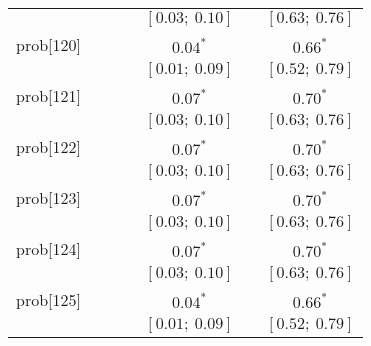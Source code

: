 \begin{table}
\begin{center}
\begin{tabular}{l c c c c c c }
          &                           &                           &                           & $[0.03;\ 0.10]$         &                           & $[0.63;\ 0.76]$       \\
prob[120] &                           &                           &                           & $0.04^{*}$              &                           & $0.66^{*}$            \\
          &                           &                           &                           & $[0.01;\ 0.09]$         &                           & $[0.52;\ 0.79]$       \\
prob[121] &                           &                           &                           & $0.07^{*}$              &                           & $0.70^{*}$            \\
          &                           &                           &                           & $[0.03;\ 0.10]$         &                           & $[0.63;\ 0.76]$       \\
prob[122] &                           &                           &                           & $0.07^{*}$              &                           & $0.70^{*}$            \\
          &                           &                           &                           & $[0.03;\ 0.10]$         &                           & $[0.63;\ 0.76]$       \\
prob[123] &                           &                           &                           & $0.07^{*}$              &                           & $0.70^{*}$            \\
          &                           &                           &                           & $[0.03;\ 0.10]$         &                           & $[0.63;\ 0.76]$       \\
prob[124] &                           &                           &                           & $0.07^{*}$              &                           & $0.70^{*}$            \\
          &                           &                           &                           & $[0.03;\ 0.10]$         &                           & $[0.63;\ 0.76]$       \\
prob[125] &                           &                           &                           & $0.04^{*}$              &                           & $0.66^{*}$            \\
          &                           &                           &                           & $[0.01;\ 0.09]$         &                           & $[0.52;\ 0.79]$       \\

\end{tabular}
\end{center}
\end{table}
